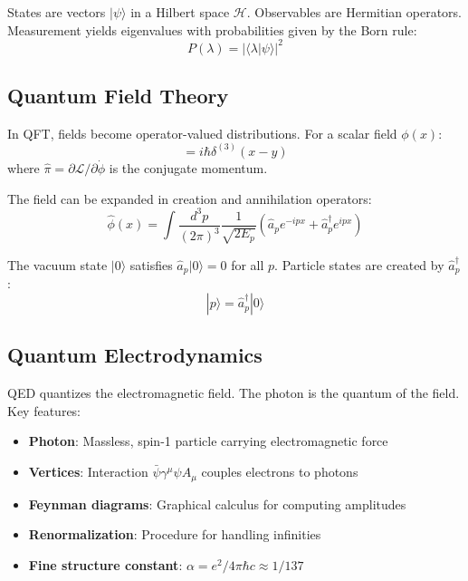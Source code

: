 \documentclass[12pt]{article}
\begin{document}
States are vectors $|\psi\rangle$ in a Hilbert space $\mathcal{H}$. Observables are Hermitian operators. Measurement yields eigenvalues with probabilities given by the Born rule:
\begin{equation}
    P(\lambda) = |\langle \lambda | \psi \rangle|^2
\end{equation}

\subsection{Quantum Field Theory}

In QFT, fields become operator-valued distributions. For a scalar field $\phi(x)$:
\begin{equation}
    [\hat{\phi}(x), \hat{\pi}(y)] = i\hbar \delta^{(3)}(x - y)
\end{equation}
where $\hat{\pi} = \partial \mathcal{L} / \partial \dot{\phi}$ is the conjugate momentum.

The field can be expanded in creation and annihilation operators:
\begin{equation}
    \hat{\phi}(x) = \int \frac{d^3 p}{(2\pi)^3} \frac{1}{\sqrt{2E_p}} \left( \hat{a}_p e^{-ipx} + \hat{a}_p^\dagger e^{ipx} \right)
\end{equation}

The vacuum state $|0\rangle$ satisfies $\hat{a}_p |0\rangle = 0$ for all $p$. Particle states are created by $\hat{a}_p^\dagger$:
\begin{equation}
    |p\rangle = \hat{a}_p^\dagger |0\rangle
\end{equation}

\subsection{Quantum Electrodynamics}

QED quantizes the electromagnetic field. The photon is the quantum of the field. Key features:

\begin{itemize}
    \item \textbf{Photon}: Massless, spin-1 particle carrying electromagnetic force
    \item \textbf{Vertices}: Interaction $\bar{\psi}\gamma^\mu \psi A_\mu$ couples electrons to photons
    \item \textbf{Feynman diagrams}: Graphical calculus for computing amplitudes
    \item \textbf{Renormalization}: Procedure for handling infinities
    \item \textbf{Fine structure constant}: $\alpha = e^2 / 4\pi\hbar c \approx 1/137$
\end{itemize}
\end{document}
